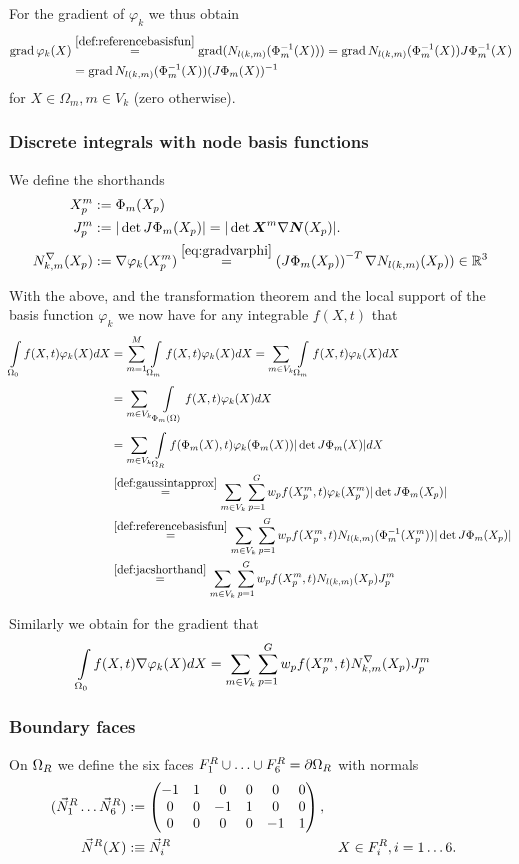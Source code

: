 For the gradient of $\varphi_k$ we thus obtain
\begin{align}
	\grad\varphi_k(X) &\re{def:referencebasisfun} \grad (N_{l(k,m)}(\Phi^{-1}_m(X)))
					  = \grad N_{l(k,m)}(\Phi^{-1}_m(X))J\Phi^{-1}_m(X)\nonumber\\
					  &= \grad N_{l(k,m)}(\Phi^{-1}_m(X))(J\Phi_m(X))^{-1}\label{eq:gradvarphi}
\end{align}
for $X\in\Omega_m, m\in V_k$ (zero otherwise).
 
\subsubsection{Discrete integrals with node basis functions}
We define the shorthands
\begin{align}
	\pmp &:= \Phi_m(X_p)\\
	\jmp &:= |\det J\Phi_m(X_p)| = |\det \vX^m\nabla\vN(X_p)|.\label{def:jacshorthand}\\
	\dNkmp &:= \nabla\varphi_k(\pmp) \re{eq:gradvarphi} \left(J\Phi_m(X_p)\right)^{-T}\nabla \Nkmp)\in\R^3\label{}
\end{align}

With the above, and the transformation theorem and the local support of the basis function $\varphi_k$ we now have for any integrable $f(X,t)$ that
\begin{align}
   \intl{\Or}{}f(X,t)\varphi_k(X)dX &= \suml{m=1}{M}\intl{\Omega_m}{}f(X,t)\varphi_k(X)dX = \sumvk\intl{\Omega_m}{}f(X,t)\varphi_k(X)dX\nonumber\\
    &= \sumvk\intl{\Phi_m(\Omega)}{}f(X,t)\varphi_k(X)dX\nonumber\\
	&= \sumvk\intl{\Om}{}f(\Phi_m(X),t)\varphi_k(\Phi_m(X))|\det J\Phi_m(X)|dX\nonumber\\
	& \re{def:gaussintapprox} \sumvk\sumgp w_pf(\pmp,t)\varphi_k(\pmp)|\det J\Phi_m(X_p)|\nonumber\\
	& \re{def:referencebasisfun} \sumvk\sumgp w_pf(\pmp,t)N_{l(k,m)}(\Phi_m^{-1}(\pmp))|\det J\Phi_m(X_p)|\nonumber\\
	& \re{def:jacshorthand} \sumvk\sumgp w_pf(\pmp,t)\Nkmp\jmp\label{eq:fphidx}
\end{align}

Similarly we obtain for the gradient that
\begin{align}
	\int\limits_{\Omega_0}^{}f(X,t)\nabla\varphi_k(X)dX &= \sum\limits_{m\in V_k}^{}\sum\limits_{p=1}^{G} w_pf(X^m_p,t)N^\nabla_{k,m}(X_p)J^m_p\label{eq:fgradphidx}
\end{align}

\subsubsection{Boundary faces}
On $\Omega_R$ we define the six faces $F_1^R \cup \ldots \cup F_6^R = \partial\Omega_R$ with normals
\begin{align*}
	(\vec{N}^R_1 \ldots \vec{N}^R_6) &:= \left(\begin{matrix}-1 & 1 & 0 & 0 & 0 & 0\\0 & 0 & -1 & 1 & 0 & 0\\0 & 0 & 0 & 0 & -1 & 1\end{matrix}\right),\\
	\vec{N}^R(X) &:\equiv \vec{N}^R_i && X\in F^R_i, i=1\ldots 6.
\end{align*}

